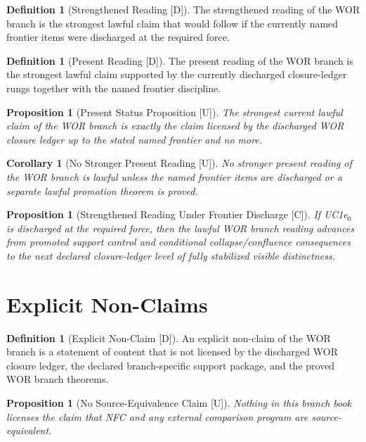\documentclass[11pt]{article}
\newtheorem{proposition}[theorem]{Proposition}
\newtheorem{corollary}[theorem]{Corollary}
\theoremstyle{definition}
\newtheorem{definition}[theorem]{Definition}
\theoremstyle{remark}
\newcommand{\U}{\textnormal{[U]}}
\newcommand{\C}{\textnormal{[C]}}
\newcommand{\D}{\textnormal{[D]}}
\begin{document}
\begin{definition}[Strengthened Reading {\D}]
The strengthened reading of the WOR branch is the strongest lawful claim that would follow if the currently named frontier items were discharged at the required force.
\end{definition}

\begin{definition}[Present Reading {\D}]
The present reading of the WOR branch is the strongest lawful claim supported by the currently discharged closure-ledger rungs together with the named frontier discipline.
\end{definition}

\begin{proposition}[Present Status Proposition {\U}]
The strongest current lawful claim of the WOR branch is exactly the claim licensed by the discharged WOR closure ledger up to the stated named frontier and no more.
\end{proposition}

\begin{corollary}[No Stronger Present Reading {\U}]
No stronger present reading of the WOR branch is lawful unless the named frontier items are discharged or a separate lawful promotion theorem is proved.
\end{corollary}

\begin{proposition}[Strengthened Reading Under Frontier Discharge {\C}]
If UC1e$_0$ is discharged at the required force, then the lawful WOR branch reading advances from promoted support control and conditional collapse/confluence consequences to the next declared closure-ledger level of fully stabilized visible distinctness.
\end{proposition}

\section{Explicit Non-Claims}

\begin{definition}[Explicit Non-Claim {\D}]
An explicit non-claim of the WOR branch is a statement of content that is not licensed by the discharged WOR closure ledger, the declared branch-specific support package, and the proved WOR branch theorems.
\end{definition}

\begin{proposition}[No Source-Equivalence Claim {\U}]
Nothing in this branch book licenses the claim that NFC and any external comparison program are source-equivalent.
\end{proposition}
\end{document}
